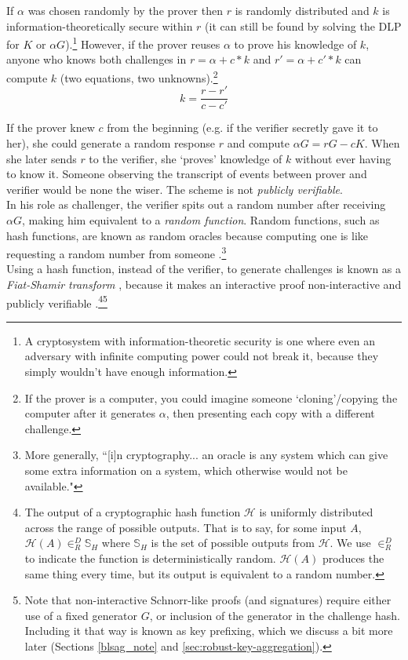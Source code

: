 If $\alpha$ was chosen randomly by the prover then $r$ is randomly distributed \cite{SCOZZAFAVA1993313} and $k$ is information-theoretically secure within $r$ (it can still be found by solving the DLP for $K$ or $\alpha G$).\footnote{\label{information_theoretic_note}A cryptosystem with information-theoretic security is one where even an adversary with infinite computing power could not break it, because they simply wouldn't have enough information.} However, if the prover reuses $\alpha$ to prove his knowledge of $k$, anyone who knows both challenges in $r = \alpha + c*k$ and $r' = \alpha + c'*k$ can compute $k$ (two equations, two unknowns).\footnote{If the prover is a computer, you could imagine someone `cloning'/copying the computer after it generates $\alpha$, then presenting each copy with a different challenge.}\vspace{.175cm}%
\[k = \frac{r-r'}{c-c'}\]

If the prover knew $c$ from the beginning (e.g. if the verifier secretly gave it to her), she could generate a random response $r$ and compute $\alpha G = r G - c K$. When she later sends $r$ to the verifier, she `proves' knowledge of $k$ without ever having to know it. Someone observing the transcript of events between prover and verifier would be none the wiser. The scheme is not {\em publicly verifiable}. \cite{Signatures2015BorromeanRS}\\

In his role as challenger, the verifier spits out a random number after receiving $\alpha G$, making him equivalent to a {\em random function}. Random functions, such as hash functions, are known as random oracles because computing one is like requesting a random number from someone \cite{Signatures2015BorromeanRS}.\footnote{More generally, ``[i]n cryptography... an oracle is any system which can give some extra information on a system, which otherwise would not be available."\cite{cryptographic-oracle}}\\

Using a hash function, instead of the verifier, to generate challenges is known as a {\em Fiat-Shamir transform} \cite{fiat-shamir-transform}, because it makes an interactive proof non-interactive and publicly verifiable \cite{Signatures2015BorromeanRS}.\footnote{The output of a cryptographic hash function $\mathcal{H}$ is uniformly distributed across the range of possible outputs. That is to say, for some input $A$, $\mathcal{H}(A) \in^D_R \mathbb{S}_H$ where $\mathbb{S}_H$ is the set of possible outputs from $\mathcal{H}$. We use $\in^D_R$ to indicate the function is deterministically random. $\mathcal{H}(A)$ produces the same thing every time, but its output is equivalent to a random number.
}\footnote{Note that non-interactive Schnorr-like proofs (and signatures) require either use of a fixed generator $G$, or inclusion of the generator in the challenge hash. Including it that way is known as key prefixing, which we discuss a bit more later (Sections \ref{blsag_note} and \ref{sec:robust-key-aggregation}).}

